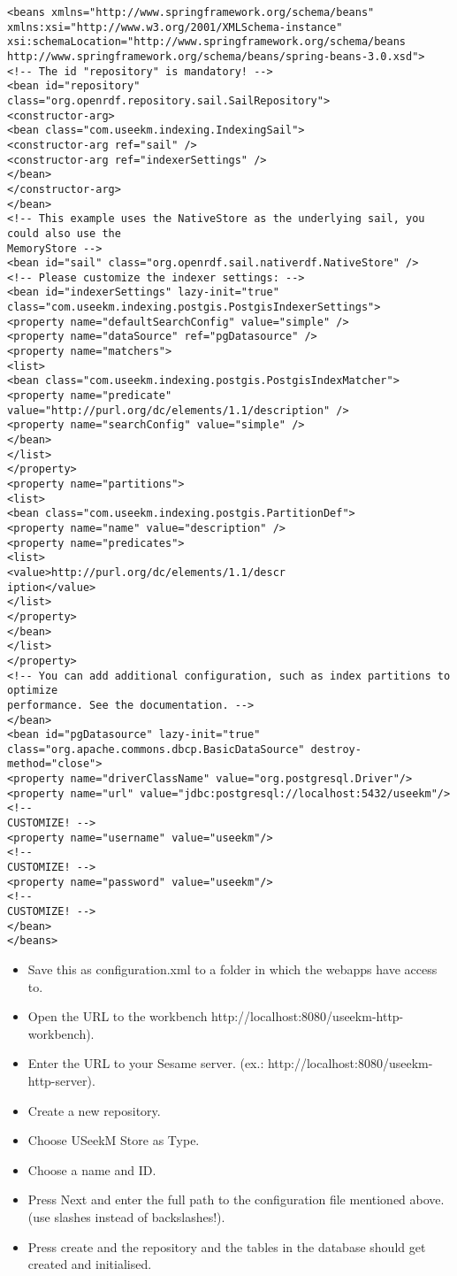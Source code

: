 \begin{lstlisting}[style=consola]
<beans xmlns="http://www.springframework.org/schema/beans"
xmlns:xsi="http://www.w3.org/2001/XMLSchema-instance"
xsi:schemaLocation="http://www.springframework.org/schema/beans
http://www.springframework.org/schema/beans/spring-beans-3.0.xsd">
<!-- The id "repository" is mandatory! -->
<bean id="repository" class="org.openrdf.repository.sail.SailRepository">
<constructor-arg>
<bean class="com.useekm.indexing.IndexingSail">
<constructor-arg ref="sail" />
<constructor-arg ref="indexerSettings" />
</bean>
</constructor-arg>
</bean>
<!-- This example uses the NativeStore as the underlying sail, you could also use the
MemoryStore -->
<bean id="sail" class="org.openrdf.sail.nativerdf.NativeStore" />
<!-- Please customize the indexer settings: -->
<bean id="indexerSettings" lazy-init="true"
class="com.useekm.indexing.postgis.PostgisIndexerSettings">
<property name="defaultSearchConfig" value="simple" />
<property name="dataSource" ref="pgDatasource" />
<property name="matchers">
<list>
<bean class="com.useekm.indexing.postgis.PostgisIndexMatcher">
<property name="predicate"
value="http://purl.org/dc/elements/1.1/description" />
<property name="searchConfig" value="simple" />
</bean>
</list>
</property>
<property name="partitions">
<list>
<bean class="com.useekm.indexing.postgis.PartitionDef">
<property name="name" value="description" />
<property name="predicates">
<list>
<value>http://purl.org/dc/elements/1.1/descr
iption</value>
</list>
</property>
</bean>
</list>
</property>
<!-- You can add additional configuration, such as index partitions to optimize
performance. See the documentation. -->
</bean>
<bean id="pgDatasource" lazy-init="true"
class="org.apache.commons.dbcp.BasicDataSource" destroy-method="close">
<property name="driverClassName" value="org.postgresql.Driver"/>
<property name="url" value="jdbc:postgresql://localhost:5432/useekm"/> <!--
CUSTOMIZE! -->
<property name="username" value="useekm"/>
<!--
CUSTOMIZE! -->
<property name="password" value="useekm"/>
<!--
CUSTOMIZE! -->
</bean>
</beans>
\end{lstlisting}

\begin{itemize}
\item Save this as configuration.xml to a folder in which the webapps have access to.
\item Open the URL to the workbench http://localhost:8080/useekm-http-workbench).
\item Enter the URL to your Sesame server. (ex.: http://localhost:8080/useekm-http-server).
\item Create a new repository.
\item Choose USeekM Store as Type.
\item Choose a name and ID.
\item Press Next and enter the full path to the configuration file mentioned above. (use
   slashes instead of backslashes!).
\item Press create and the repository and the tables in the database should get created and
initialised.
\end{itemize}

